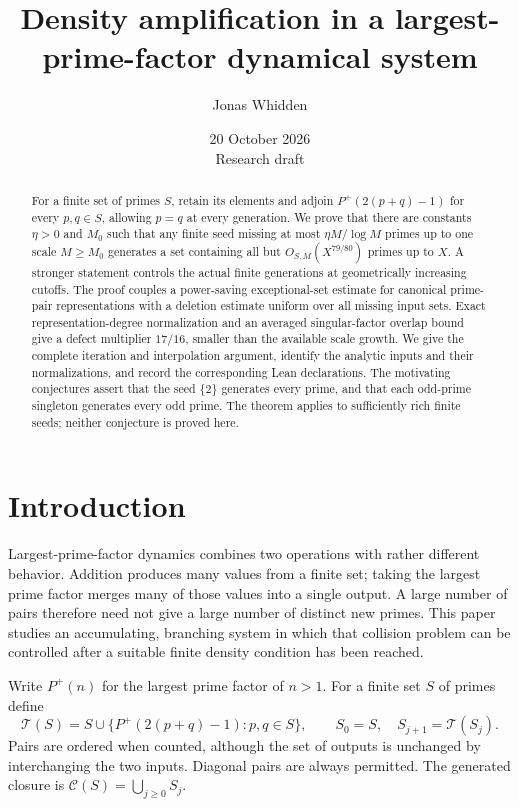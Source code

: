 \documentclass[11pt]{article}
\title{Density amplification in a largest-prime-factor dynamical system}
\author{Jonas Whidden}
\date{20 October 2026\\\small Research draft}
\theoremstyle{definition}
\theoremstyle{remark}
\newcommand{\Cl}{\mathcal C}
\newcommand{\cT}{\mathcal T}
\begin{document}
\maketitle

\begin{abstract}
For a finite set of primes \(S\), retain its elements and adjoin
\(P^{+}(2(p+q)-1)\) for every \(p,q\in S\), allowing \(p=q\) at every
generation. We prove that there are constants \(\eta>0\) and \(M_0\)
such that any finite seed missing at most \(\eta M/\log M\) primes
up to one scale \(M\ge M_0\) generates a set containing all but
\(O_{S,M}(X^{79/80})\) primes up to \(X\). A stronger statement controls
the actual finite generations at geometrically increasing cutoffs.
The proof couples a power-saving exceptional-set estimate for canonical
prime-pair representations with a deletion estimate uniform over all
missing input sets. Exact representation-degree normalization and an
averaged singular-factor overlap bound give a defect multiplier \(17/16\),
smaller than the available scale growth. We give the complete iteration
and interpolation argument, identify the analytic inputs and their
normalizations, and record the corresponding Lean declarations.
The motivating conjectures assert that the seed \(\{2\}\) generates every
prime, and that each odd-prime singleton generates every odd prime.
The theorem applies to sufficiently rich finite seeds; neither conjecture
is proved here.
\end{abstract}

\section{Introduction}

Largest-prime-factor dynamics combines two operations with rather different
behavior. Addition produces many values from a finite set; taking the largest
prime factor merges many of those values into a single output. A large number
of pairs therefore need not give a large number of distinct new primes.
This paper studies an accumulating, branching system in which that collision
problem can be controlled after a suitable finite density condition has
been reached.

Write \(P^{+}(n)\) for the largest prime factor of \(n>1\). For a finite
set \(S\) of primes define
\begin{equation}\label{eq:step}
 \cT(S)=S\cup\{P^{+}(2(p+q)-1):p,q\in S\},
 \qquad S_0=S,\quad S_{j+1}=\cT(S_j).
\end{equation}
Pairs are ordered when counted, although the set of outputs is unchanged
by interchanging the two inputs. Diagonal pairs are always permitted.
The generated closure is \(\Cl(S)=\bigcup_{j\ge0}S_j\).
\end{document}
